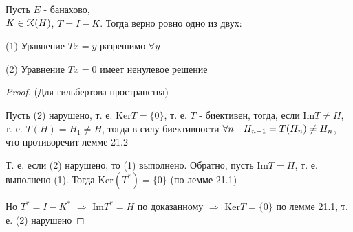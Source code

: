 \documentclass[a4paper,12pt]{report}
\newcommand*{\hm}[1]{#1\nobreak\discretionary{}%
            {\hbox{$\mathsurround=0pt #1$}}{}}
\begin{document}
\begin{thm}
Пусть $E$ - банахово, \\$K\hm\in\EuScript K(H)$, $T=I-K$. Тогда верно ровно одно из двух:

(1) Уравнение $Tx=y$ разрешимо $\forall y$

(2) Уравнение $Tx=0$ имеет ненулевое решение
\end{thm}
\begin{proof}
(Для гильбертова пространства)

Пусть (2) нарушено, т. е. $\mathrm{Ker} T=\{0\}$, т. е. $T$ - биективен, тогда, если $\mathrm{Im}T\ne H$, т. е. $T(H)=H_1\ne H$, тогда в силу биективности $\forall n\quad H_{n+1}\hm=T(H_n)\ne H_n$, что противоречит лемме 21.2

Т. е. если (2) нарушено, то (1) выполнено. Обратно, пусть $\mathrm{Im}T=H$, т. е. выполнено (1). Тогда $\mathrm{Ker}(T^*)=\{0\}$ (по лемме 21.1)

Но $T^*=I-K^*$ $\Rightarrow$ $\mathrm{Im} T^*=H$ по доказанному $\Rightarrow$ $\mathrm{Ker}T=\{0\}$ по лемме 21.1, т. е. (2) нарушено
\end{proof}
 
\end{document}
